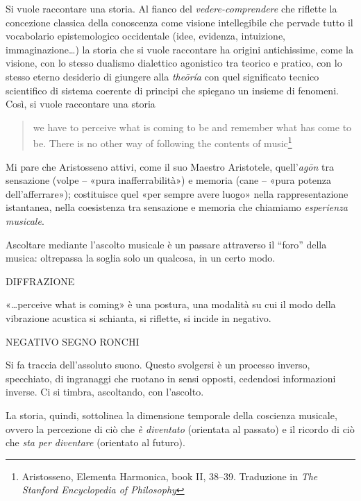 Si vuole raccontare una storia. Al fianco del \emph{vedere-comprendere} che
riflette la concezione classica della conoscenza come visione intellegibile che
pervade tutto il vocabolario epistemologico occidentale (idee, evidenza,
intuizione, immaginazione\ldots) la storia che si vuole raccontare ha origini
antichissime, come la visione, con lo stesso dualismo dialettico agonistico tra
teorico e pratico, con lo stesso eterno desiderio di giungere alla \emph{theōría}
con quel significato tecnico scientifico di sistema coerente di principi che
spiegano un insieme di fenomeni. Così, si vuole raccontare una storia %

\begin{quote}
\begin{sf}
\small
we have to perceive what is coming to be and remember what has come to be. There
is no other way of following the contents of music\footnote{Aristosseno, Elementa
Harmonica, book II, 38–39. Traduzione in \emph{The Stanford Encyclopedia of
Philosophy}}
\end{sf}
\end{quote}

Mi pare che Aristosseno attivi, come il suo Maestro Aristotele, quell'\emph{agōn}
\cite{ronchi2001} tra sensazione (volpe – «pura inafferrabilità») e memoria (cane
– «pura potenza dell'afferrare»); costituisce quel «per sempre avere luogo» nella
rappresentazione istantanea, nella coesistenza tra sensazione e memoria che
chiamiamo \emph{esperienza musicale}.

Ascoltare mediante l'ascolto musicale è un passare attraverso il “foro” della
musica: oltrepassa la soglia solo un qualcosa, in un certo modo.

\vspace{1cm}

DIFFRAZIONE

«\ldots perceive what is coming» è una postura, una modalità su cui il modo della
vibrazione acustica si schianta, si riflette, si incide in negativo.

\vspace{1cm}

NEGATIVO SEGNO RONCHI

Si fa traccia dell'assoluto suono. Questo svolgersi è un processo inverso,
specchiato, di ingranaggi che ruotano in sensi opposti, cedendosi informazioni
inverse. Ci si timbra, ascoltando, con l'ascolto.

La storia, quindi, sottolinea la dimensione temporale della coscienza musicale,
ovvero la percezione di ciò che \emph{è diventato} (orientata al passato) e il
ricordo di ciò che \emph{sta per diventare} (orientato al futuro).

